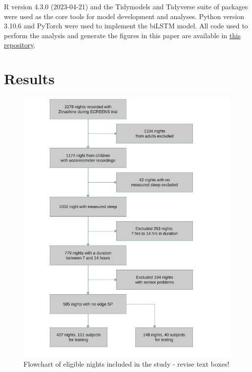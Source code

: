 \documentclass[
  super,
  preprint,
  3p]{elsarticle}
\begin{document}
R version 4.3.0 (2023-04-21)\citep{R-lang} and the
Tidymodels\citep{tidymodels} and Tidyverse\citep{tidyverse} suite of
packages were used as the core tools for model development and analyses.
Python version 3.10.6\citep{10.5555/1593511} and
PyTorch\citep{NEURIPS2019_9015} were used to implement the biLSTM model.
All code used to perform the analysis and generate the figures in this
paper are available in
\href{https://github.com/esbenlykke/sleep_study}{this repository}.

\hypertarget{results}{%
\section{Results}\label{results}}

\begin{figure}[b]

{\centering \includegraphics{visuals/flowchart_of_elligible_nights.pdf}

}

\caption{Flowchart of eligible nights included in the study - revise
text boxes!}

\end{figure}
\end{document}
